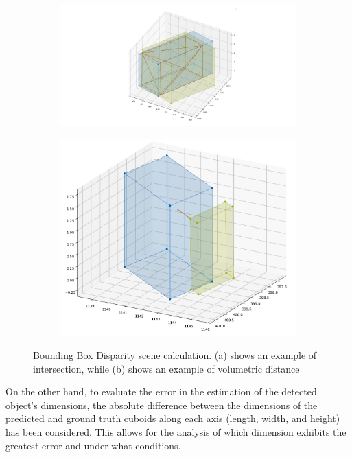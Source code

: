 \begin{figure}[h!]
    \centering
    \begin{subfigure}[b]{0.45\textwidth}
        \includegraphics[width=\textwidth]{images/methodology/frame_0_3d_bb.png}
        \caption{}
        \label{fig:bbox_disparity_a}
    \end{subfigure}
    \begin{subfigure}[b]{0.45\textwidth}
        \includegraphics[width=\textwidth]{images/methodology/frame_2_3d_bb.png}
        \caption{}
        \label{fig:bbox_disparity_b}
    \end{subfigure}
    \caption{Bounding Box Disparity scene calculation. (a) shows an example of intersection, while (b) shows an example of volumetric distance}
    \label{fig:bbox_disparity}
\end{figure}

On the other hand, to evaluate the error in the estimation of the detected object's dimensions, the absolute difference between the dimensions of the predicted and ground truth cuboids along each axis (length, width, and height) has been considered. This allows for the analysis of which dimension exhibits the greatest error and under what conditions.

